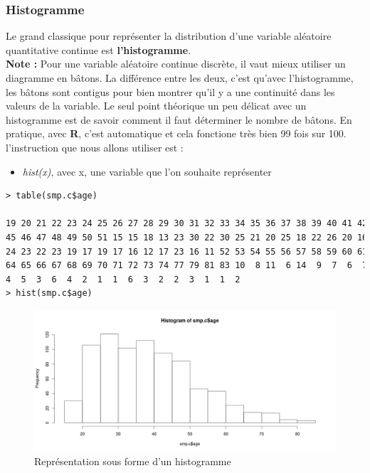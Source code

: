 \subsubsection{Histogramme}
Le grand classique pour représenter la distribution d'une variable aléatoire quantitative continue est \textbf{l'histogramme}.  \newline
\\
\textbf{Note :} Pour une variable aléatoire continue discrète, il vaut mieux utiliser un diagramme en bâtons.\newline
La différence entre les deux, c'est qu'avec l'histogramme, les bâtons sont contigus pour bien montrer qu'il y a une continuité dans les valeurs de la variable. \newline
Le seul point théorique un peu délicat avec un histogramme est de savoir comment il faut déterminer le nombre de bâtons. En pratique, avec \textbf{R}, c'est automatique et cela fonctione très bien 99 fois sur 100.\newline
l'instruction que nous allons utiliser est : 
\textcolor{white}{.}\newline
\begin{itemize}
\item \textit{hist(x)}, avec x, une variable que l'on souhaite représenter
\end{itemize}
\begin{lstlisting}[language=html]
> table(smp.c$age)

19 20 21 22 23 24 25 26 27 28 29 30 31 32 33 34 35 36 37 38 39 40 41 42 43 44 
45 46 47 48 49 50 51 15 15 18 13 23 30 22 30 25 21 20 25 18 22 26 20 16 18 25 
24 23 22 23 19 17 19 17 16 12 17 23 16 11 52 53 54 55 56 57 58 59 60 61 62 63 
64 65 66 67 68 69 70 71 72 73 74 77 79 81 83 10  8 11  6 14  9  7  6  7  5  7  
4  5  3  6  4  2  1  1  6  3  2  2  3  1  1  2 
> hist(smp.c$age)
\end{lstlisting}
\begin{figure}[H]\begin{center}\includegraphics[scale=0.4]{ilu/tp3.png}\caption{Représentation sous forme d'un histogramme}\end{center}\end{figure}
